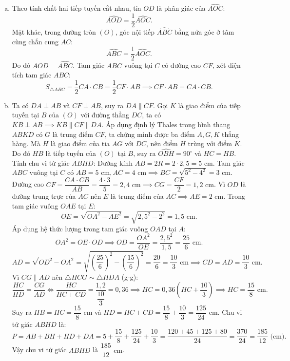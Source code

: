 \begin{bt}
{\begin{enumerate}[a)]
	$$\widehat{OAD} = 90^\circ \text{ và } \widehat{OCD} = 90^\circ.$$
	Tứ giác $OACD$ có $\widehat{OAD} + \widehat{OCD} = 90^\circ + 90^\circ = 180^\circ$, do đó bốn điểm $O, A, C, D$ cùng thuộc đường tròn đường kính $OD$.
	Tam giác $ABC$ nội tiếp đường tròn $(O)$ có cạnh $AB$ là đường kính nên $\widehat{ACB} = 90^\circ$, suy ra $BC \perp AC$.
	\item Theo tính chất hai tiếp tuyến cắt nhau, tia $OD$ là phân giác của $\widehat{AOC}$:
	$$\widehat{AOD} = \dfrac{1}{2}\widehat{AOC}.$$
	Mặt khác, trong đường tròn $(O)$, góc nội tiếp $\widehat{ABC}$ bằng nửa góc ở tâm cùng chắn cung $AC$:
	$$\widehat{ABC} = \dfrac{1}{2}\widehat{AOC}.$$
	Do đó $\widehat{AOD} = \widehat{ABC}$.
	Tam giác $ABC$ vuông tại $C$ có đường cao $CF$, xét diện tích tam giác $ABC$:
	$$S_{\triangle ABC} = \dfrac{1}{2} CA \cdot CB = \dfrac{1}{2} CF \cdot AB \implies CF \cdot AB = CA \cdot CB.$$
	\item Ta có $DA \perp AB$ và $CF \perp AB$, suy ra $DA \parallel CF$.
	Gọi $K$ là giao điểm của tiếp tuyến tại $B$ của $(O)$ với đường thẳng $DC$, ta có $KB \perp AB \implies KB \parallel CF \parallel DA$.
	Áp dụng định lý Thales trong hình thang $ABKD$ có $G$ là trung điểm $CF$, ta chứng minh được ba điểm $A, G, K$ thẳng hàng.
	Mà $H$ là giao điểm của tia $AG$ với $DC$, nên điểm $H$ trùng với điểm $K$.
	Do đó $HB$ là tiếp tuyến của $(O)$ tại $B$, suy ra $\widehat{OBH} = 90^\circ$ và $HC = HB$.
	Tính chu vi tứ giác $ABHD$:
	Đường kính $AB = 2R = 2 \cdot 2{,}5 = 5\text{ cm}$.
	Tam giác $ABC$ vuông tại $C$ có $AB = 5\text{ cm}, AC = 4\text{ cm} \implies BC = \sqrt{5^2 - 4^2} = 3\text{ cm}$.
	Đường cao $CF = \dfrac{CA \cdot CB}{AB} = \dfrac{4 \cdot 3}{5} = 2{,}4\text{ cm} \implies CG = \dfrac{CF}{2} = 1{,}2\text{ cm}$.
	Vì $OD$ là đường trung trực của $AC$ nên $E$ là trung điểm của $AC \implies AE = 2\text{ cm}$.
	Trong tam giác vuông $OAE$ tại $E$:
	$$OE = \sqrt{OA^2 - AE^2} = \sqrt{2{,}5^2 - 2^2} = 1{,}5\text{ cm}.$$
	Áp dụng hệ thức lượng trong tam giác vuông $OAD$ tại $A$:
	$$OA^2 = OE \cdot OD \implies OD = \dfrac{OA^2}{OE} = \dfrac{2{,}5^2}{1{,}5} = \dfrac{25}{6}\text{ cm}.$$
	$$AD = \sqrt{OD^2 - OA^2} = \sqrt{\left(\dfrac{25}{6}\right)^2 - \left(\dfrac{15}{6}\right)^2} = \dfrac{20}{6} = \dfrac{10}{3}\text{ cm} \implies CD = AD = \dfrac{10}{3}\text{ cm}.$$
	Vì $CG \parallel AD$ nên $\triangle HCG \sim \triangle HDA$ (g-g):
	$$\dfrac{HC}{HD} = \dfrac{CG}{AD} \iff \dfrac{HC}{HC + CD} = \dfrac{1{,}2}{\dfrac{10}{3}} = 0{,}36 \implies HC = 0{,}36\left(HC + \dfrac{10}{3}\right) \implies HC = \dfrac{15}{8}\text{ cm}.$$
	Suy ra $HB = HC = \dfrac{15}{8}\text{ cm}$ và $HD = HC + CD = \dfrac{15}{8} + \dfrac{10}{3} = \dfrac{125}{24}\text{ cm}$.
	Chu vi tứ giác $ABHD$ là:
	$$P = AB + BH + HD + DA = 5 + \dfrac{15}{8} + \dfrac{125}{24} + \dfrac{10}{3} = \dfrac{120 + 45 + 125 + 80}{24} = \dfrac{370}{24} = \dfrac{185}{12}\text{ (cm)}.$$
	Vậy chu vi tứ giác $ABHD$ là $\dfrac{185}{12}\text{ cm}$.
\end{enumerate}
}
\end{bt}

